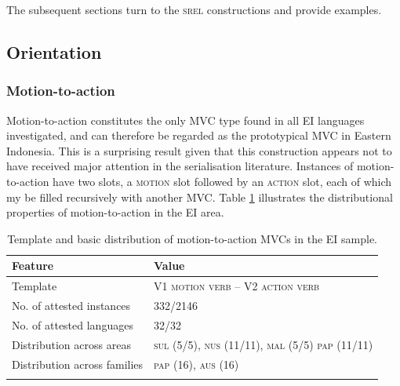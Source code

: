 The subsequent sections turn to the \textsc{srel} constructions and provide examples.

\subsection{Orientation} \label{sec:orientation}
\subsubsection{Motion-to-action} \label{sec:motion-to-action}

Motion-to-action constitutes the only MVC type found in all EI languages investigated, and can therefore be regarded as the prototypical MVC in Eastern Indonesia. This is a surprising result given that this construction appears not to have received major attention in the serialisation literature. Instances of motion-to-action have two slots, a \textsc{motion} slot followed by an \textsc{action} slot, each of which my be filled recursively with another MVC. Table \ref{table:motion-to-action} illustrates the distributional properties of motion-to-action in the EI area.

\begin{table}
\begin{tabular}{ll}
\lsptoprule
Feature&Value\tabularnewline
\midrule
Template&V1 \textsc{motion verb} -- V2 \textsc{action verb}\tabularnewline
No. of attested instances& 332/2146 \tabularnewline
No. of attested languages& 32/32 \tabularnewline
Distribution across areas& \textsc{sul} (5/5), \textsc{nus} (11/11), \textsc{mal} (5/5) \textsc{pap} (11/11) \tabularnewline
Distribution across families& \textsc{pap} (16), \textsc{aus} (16) \tabularnewline
\lspbottomrule
\end{tabular}
\caption[Template and basic distribution of motion-to-action MVCs]{Template and basic distribution of motion-to-action MVCs in the EI sample.}
\label{table:motion-to-action}
\end{table}


